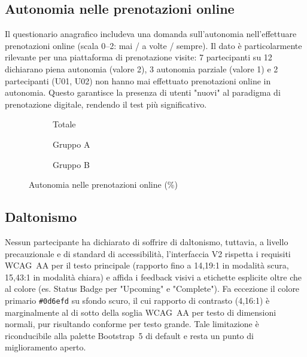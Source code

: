 \subsection{Autonomia nelle prenotazioni online}
Il questionario anagrafico includeva una domanda sull'autonomia nell'effettuare prenotazioni online (scala 0--2: mai / a volte / sempre). Il dato è particolarmente rilevante per una piattaforma di prenotazione visite: 7 partecipanti su 12 dichiarano piena autonomia (valore 2), 3 autonomia parziale (valore 1) e 2 partecipanti (U01, U02) non hanno mai effettuato prenotazioni online in autonomia. Questo garantisce la presenza di utenti "nuovi" al paradigma di prenotazione digitale, rendendo il test più significativo.

\vspace{0.5em}
\begin{figure}[H]
    \centering
    \begin{subfigure}{0.33\textwidth}
        \centering
        \caption{Totale}
    \end{subfigure}%
    \hfill
    \begin{subfigure}{0.33\textwidth}
        \centering
        \caption{Gruppo A}
    \end{subfigure}%
    \hfill
    \begin{subfigure}{0.33\textwidth}
        \centering
        \caption{Gruppo B}
    \end{subfigure}
    \caption{Autonomia nelle prenotazioni online (\%)}
\end{figure}

\subsection{Daltonismo}
Nessun partecipante ha dichiarato di soffrire di daltonismo, tuttavia, a livello precauzionale e di standard di accessibilità, l'interfaccia V2 rispetta i requisiti WCAG~AA per il testo principale (rapporto fino a 14,19:1 in modalità scura, 15,43:1 in modalità chiara) e affida i feedback visivi a etichette esplicite oltre che al colore (es. Status Badge per "Upcoming" e "Complete"). Fa eccezione il colore primario \texttt{\#0d6efd} su sfondo scuro, il cui rapporto di contrasto (4,16:1) è marginalmente al di sotto della soglia WCAG~AA per testo di dimensioni normali, pur risultando conforme per testo grande. Tale limitazione è riconducibile alla palette Bootstrap~5 di default e resta un punto di miglioramento aperto.

